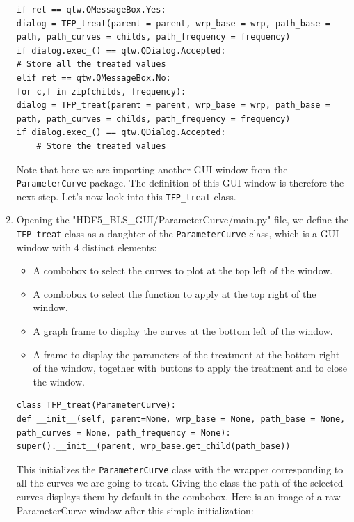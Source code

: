 \begin{enumerate}
\begin{lstlisting}
if ret == qtw.QMessageBox.Yes: 
dialog = TFP_treat(parent = parent, wrp_base = wrp, path_base = path, path_curves = childs, path_frequency = frequency)
if dialog.exec_() == qtw.QDialog.Accepted:
# Store all the treated values
elif ret == qtw.QMessageBox.No:
for c,f in zip(childs, frequency):
dialog = TFP_treat(parent = parent, wrp_base = wrp, path_base = path, path_curves = childs, path_frequency = frequency)
if dialog.exec_() == qtw.QDialog.Accepted:
    # Store the treated values
\end{lstlisting}
    Note that here we are importing another GUI window from the \texttt{ParameterCurve} package. The definition of this GUI window is therefore the next step. Let's now look into this \texttt{TFP\_treat} class.
    \item Opening the "HDF5\_BLS\_GUI/ParameterCurve/main.py" file, we define the \texttt{TFP\_treat} class as a daughter of the \texttt{ParameterCurve} class, which is a GUI window with 4 distinct elements:
    \begin{itemize}
        \item A combobox to select the curves to plot at the top left of the window.
        \item A combobox to select the function to apply at the top right of the window.
        \item A graph frame to display the curves at the bottom left of the window.
        \item A frame to display the parameters of the treatment at the bottom right of the window, together with buttons to apply the treatment and to close the window.
    \end{itemize}
\begin{lstlisting}
class TFP_treat(ParameterCurve):
def __init__(self, parent=None, wrp_base = None, path_base = None, path_curves = None, path_frequency = None):
super().__init__(parent, wrp_base.get_child(path_base))
\end{lstlisting}
    This initializes the \texttt{ParameterCurve} class with the wrapper corresponding to all the curves we are going to treat. Giving the class the path of the selected curves displays them by default in the combobox.
    Here is an image of a raw ParameterCurve window after this simple initialization:
    \begin{center}

\end{center}
\end{enumerate}
